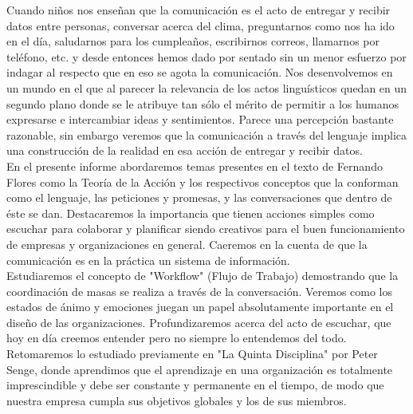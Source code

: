Cuando ni\~nos nos ense\~nan que la comunicaci\'on es el acto de entregar y recibir datos entre
personas, conversar acerca del clima, preguntarnos como nos ha ido en el d\'ia, saludarnos para los
cumplea\~nos, escribirnos correos, llamarnos por tel\'efono, etc. y desde entonces hemos dado por
sentado sin un menor esfuerzo por indagar al respecto que en eso se agota la comunicaci\'on. Nos
desenvolvemos en un mundo en el que al parecer la relevancia de los actos lingu\'isticos quedan en
un segundo plano donde se le atribuye tan s\'olo el m\'erito de permitir a los humanos expresarse e
intercambiar ideas y sentimientos. Parece una percepci\'on bastante razonable, sin embargo veremos 
que la comunicaci\'on a trav\'es del lenguaje implica una construcci\'on de la realidad en esa acci\'on
 de entregar y recibir datos.\\

En el presente informe abordaremos temas presentes en el texto de Fernando Flores como
la Teor\'ia de la Acci\'on y los respectivos conceptos que la conforman como el lenguaje, las peticiones y
promesas, y las conversaciones que dentro de \'este se dan. Destacaremos la importancia que tienen
acciones simples como escuchar para colaborar y planificar siendo creativos para el buen funcionamiento
 de empresas y organizaciones en general. Caeremos en la cuenta de que la comunicaci\'on
es en la pr\'actica un sistema de informaci\'on.\\

Estudiaremos el concepto de "Workflow" (Flujo de Trabajo) demostrando que la coordinaci\'on
de masas se realiza a trav\'es de la conversaci\'on. Veremos como los estados de \'animo y emociones
juegan un papel absolutamente importante en el dise\~no de las organizaciones. Profundizaremos
acerca del acto de escuchar, que hoy en d\'ia creemos entender pero no siempre lo entendemos del
todo.\\

Retomaremos lo estudiado previamente en "La Quinta Disciplina" por Peter Senge, donde
aprendimos que el aprendizaje en una organizaci\'on es totalmente imprescindible y debe ser constante
 y permanente en el tiempo, de modo que nuestra empresa cumpla sus objetivos globales y
los de sus miembros.
\vspace{5cm}

